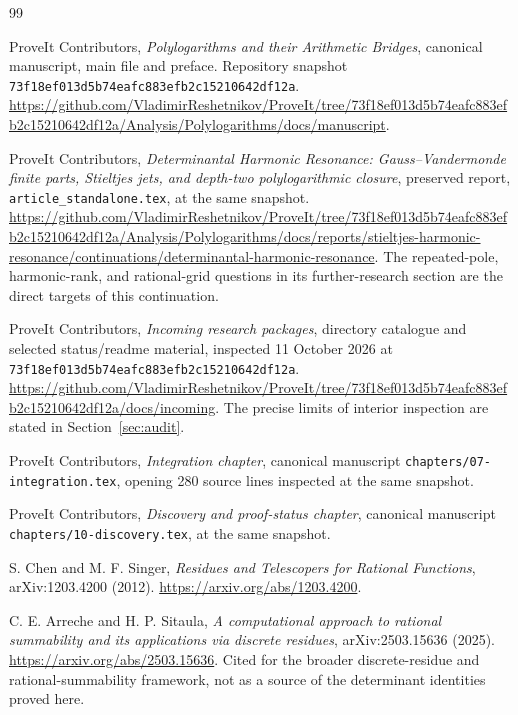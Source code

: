 \documentclass[11pt,letterpaper]{article}
\numberwithin{equation}{section}
\theoremstyle{definition}\newtheorem{definition}[theorem]{Definition}
\theoremstyle{remark}\newtheorem{remark}[theorem]{Remark}
\newcommand{\pin}{\texttt{73f18ef013d5b74eafc883efb2c15210642df12a}}
\begin{document}
\begin{thebibliography}{99}

ProveIt Contributors,
\emph{Polylogarithms and their Arithmetic Bridges}, canonical manuscript,
main file and preface. Repository snapshot \pin.
\url{https://github.com/VladimirReshetnikov/ProveIt/tree/73f18ef013d5b74eafc883efb2c15210642df12a/Analysis/Polylogarithms/docs/manuscript}.

ProveIt Contributors,
\emph{Determinantal Harmonic Resonance: Gauss--Vandermonde finite parts,
Stieltjes jets, and depth-two polylogarithmic closure}, preserved report,
\texttt{article\_standalone.tex}, at the same snapshot.
\url{https://github.com/VladimirReshetnikov/ProveIt/tree/73f18ef013d5b74eafc883efb2c15210642df12a/Analysis/Polylogarithms/docs/reports/stieltjes-harmonic-resonance/continuations/determinantal-harmonic-resonance}.
The repeated-pole, harmonic-rank, and rational-grid questions in its
further-research section are the direct targets of this continuation.

ProveIt Contributors,
\emph{Incoming research packages}, directory catalogue and selected
status/readme material, inspected 11 October 2026 at \pin.
\url{https://github.com/VladimirReshetnikov/ProveIt/tree/73f18ef013d5b74eafc883efb2c15210642df12a/docs/incoming}.
The precise limits of interior inspection are stated in Section~\ref{sec:audit}.

ProveIt Contributors,
\emph{Integration chapter},
canonical manuscript \texttt{chapters/07-integration.tex}, opening 280
source lines inspected at the same snapshot.

ProveIt Contributors,
\emph{Discovery and proof-status chapter}, canonical manuscript
\texttt{chapters/10-discovery.tex}, at the same snapshot.

S. Chen and M. F. Singer,
\emph{Residues and Telescopers for Rational Functions},
arXiv:1203.4200 (2012).
\url{https://arxiv.org/abs/1203.4200}.

C. E. Arreche and H. P. Sitaula,
\emph{A computational approach to rational summability and its applications
via discrete residues}, arXiv:2503.15636 (2025).
\url{https://arxiv.org/abs/2503.15636}.
Cited for the broader discrete-residue and rational-summability framework,
not as a source of the determinant identities proved here.


\end{thebibliography}
\end{document}
